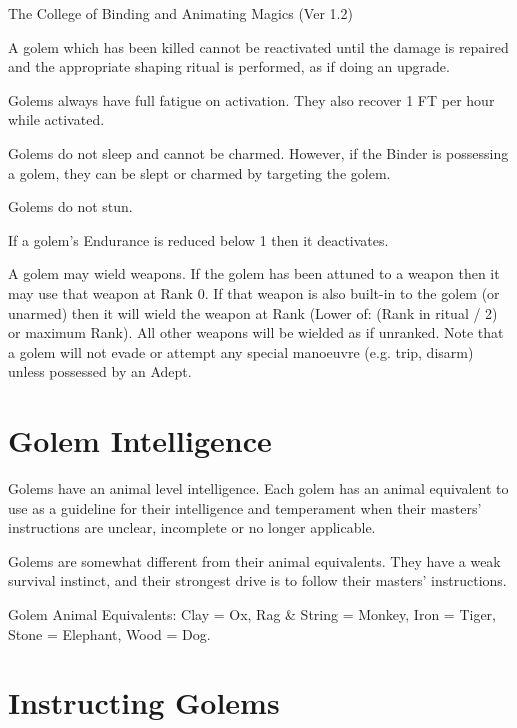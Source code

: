 \begin{Chapter}{The College of Binding and Animating Magics (Ver 1.2)}
\begin{Description}
\item[Dead Golems] A golem which has been killed cannot be reactivated
  until the damage is repaired and the appropriate shaping ritual is
  performed, as if doing an upgrade.

\item[Fatigue Recovery] Golems always have full fatigue on activation.
  They also recover 1 FT per hour while activated.

\item[Sleep and Charm] Golems do not sleep and cannot be charmed.
  However, if the Binder is possessing a golem, they can be slept or
  charmed by targeting the golem.

\item[Stun] Golems do not stun.

\item[Unconsciousness] If a golem’s Endurance is reduced below 1 then
  it deactivates.

\item[Weapon Ranks] A golem may wield weapons.  If the golem has been
  attuned to a weapon then it may use that weapon at Rank 0.  If that
  weapon is also built-in to the golem (or unarmed) then it will wield
  the weapon at Rank (Lower of: (Rank in ritual / 2) or maximum Rank).
  All other weapons will be wielded as if unranked.  Note that a golem
  will not evade or attempt any special manoeuvre (e.g. trip, disarm)
  unless possessed by an Adept.

\end{Description}
  
\section{Golem Intelligence}

Golems have an animal level intelligence.  Each golem has an animal
equivalent to use as a guideline for their intelligence and
temperament when their masters’ instructions are unclear, incomplete
or no longer applicable.

Golems are somewhat different from their animal equivalents.  They
have a weak survival instinct, and their strongest drive is to follow
their masters’ instructions.

Golem Animal Equivalents: Clay = Ox, Rag \& String = Monkey, Iron =
Tiger, Stone = Elephant, Wood = Dog.

\section{Instructing Golems}


\end{Chapter}
